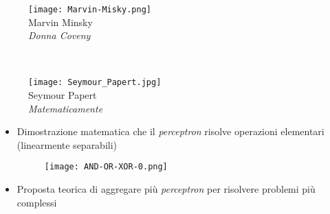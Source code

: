 \begin{frame}[t,fragile]
{{\begin{minipage}[t]{\textwidth}
\begin{minipage}[t]{0.3\textwidth}
\begin{minipage}[t]{\textwidth}
\begin{figure}[ht]
					\texttt{[image: Marvin-Misky.png]}
					{\tiny\\Marvin Minsky\\\vspace*{-4pt}\textit{\textcopyright Donna Coveny}}
				\end{figure}
			\end{minipage}
			\\
			\begin{minipage}[t]{\textwidth}
				\begin{figure}[ht]
					\texttt{[image: Seymour\_Papert.jpg]}
					{\tiny\\Seymour Papert\\\vspace*{-4pt}\textit{\textcopyright Matematicamente}}
				\end{figure}
			\end{minipage}
		\end{minipage}
		\hfill
		\begin{minipage}[t]{0.65\textwidth}
			\begin{itemize}[leftmargin=0pt,align=right]
			\item[\alert{\faArrowCircleRight}] Dimostrazione matematica che il \textit{perceptron} risolve operazioni elementari (\alert{linearmente separabili})
			\begin{figure}[ht]
				\texttt{[image: AND-OR-XOR-0.png]}
			\end{figure}
			\item[\alert{\faArrowCircleRight}] Proposta teorica di \alert{aggregare più \textit{perceptron}} per risolvere problemi più complessi
		\end{itemize}
		\end{minipage}
	\end{minipage}
	}
	}
\end{frame}
